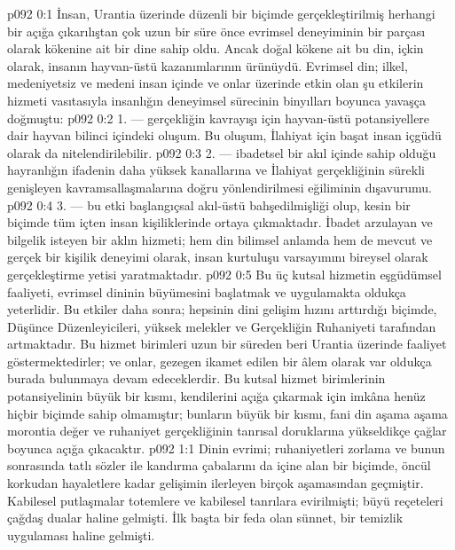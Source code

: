 \vs p092 0:1 İnsan, Urantia üzerinde düzenli bir biçimde gerçekleştirilmiş herhangi bir açığa çıkarılıştan çok uzun bir süre önce evrimsel deneyiminin bir parçası olarak  kökenine ait bir dine sahip oldu. Ancak doğal kökene ait bu din, içkin olarak, insanın hayvan\hyp{}üstü kazanımlarının ürünüydü. Evrimsel din; ilkel, medeniyetsiz ve medeni insan içinde ve onlar üzerinde etkin olan şu etkilerin hizmeti vasıtasıyla insanlığın deneyimsel sürecinin binyılları boyunca yavaşça doğmuştu:
\vs p092 0:2 1.\bibnobreakspace {} --- gerçekliğin kavrayışı için hayvan\hyp{}üstü potansiyellere dair hayvan bilinci içindeki oluşum. Bu oluşum, İlahiyat için başat insan içgüdü olarak da nitelendirilebilir.
\vs p092 0:3 2.\bibnobreakspace {} --- ibadetsel bir akıl içinde sahip olduğu hayranlığın ifadenin daha yüksek kanallarına ve İlahiyat gerçekliğinin sürekli genişleyen kavramsallaşmalarına doğru yönlendirilmesi eğiliminin dışavurumu.
\vs p092 0:4 3.\bibnobreakspace {} --- bu etki başlangıçsal akıl\hyp{}üstü bahşedilmişliği olup, kesin bir biçimde tüm içten insan kişiliklerinde ortaya çıkmaktadır. İbadet arzulayan ve bilgelik isteyen bir aklın hizmeti; hem din bilimsel anlamda hem de mevcut ve gerçek bir kişilik deneyimi olarak, insan kurtuluşu varsayımını bireysel olarak gerçekleştirme yetisi yaratmaktadır.
\vs p092 0:5 Bu üç kutsal hizmetin eşgüdümsel faaliyeti, evrimsel dininin büyümesini başlatmak ve uygulamakta oldukça yeterlidir. Bu etkiler daha sonra; hepsinin dini gelişim hızını arttırdığı biçimde, Düşünce Düzenleyicileri, yüksek melekler ve Gerçekliğin Ruhaniyeti tarafından artmaktadır. Bu hizmet birimleri uzun bir süreden beri Urantia üzerinde faaliyet göstermektedirler; ve onlar, gezegen ikamet edilen bir âlem olarak var oldukça burada bulunmaya devam edeceklerdir. Bu kutsal hizmet birimlerinin potansiyelinin büyük bir kısmı, kendilerini açığa çıkarmak için imkâna henüz hiçbir biçimde sahip olmamıştır; bunların büyük bir kısmı, fani din aşama aşama morontia değer ve ruhaniyet gerçekliğinin tanrısal doruklarına yükseldikçe çağlar boyunca açığa çıkacaktır.
\vs p092 1:1 Dinin evrimi; ruhaniyetleri zorlama ve bunun sonrasında tatlı sözler ile kandırma çabalarını da içine alan bir biçimde, öncül korkudan hayaletlere kadar gelişimin ilerleyen birçok aşamasından geçmiştir. Kabilesel putlaşmalar totemlere ve kabilesel tanrılara evirilmişti; büyü reçeteleri çağdaş dualar haline gelmişti. İlk başta bir feda olan sünnet, bir temizlik uygulaması haline gelmişti.
